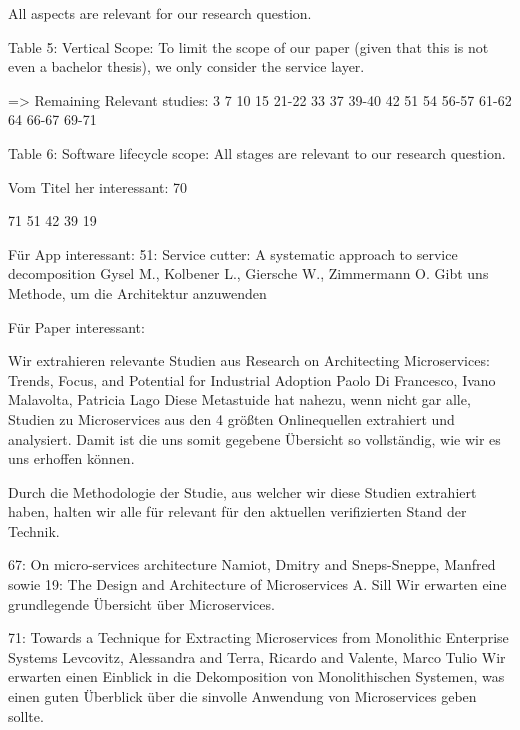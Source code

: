 \documentclass{article}
\begin{document}
    All aspects are relevant for our research question.


Table 5: Vertical Scope:
    To limit the scope of our paper (given that this is not even a bachelor thesis), we only consider the service layer.
 
=> Remaining Relevant studies:
    3
    7
    10
    15
    21-22
    33
    37
    39-40
    42
    51
    54
    56-57
    61-62
    64
    66-67
    69-71
    
Table 6: Software lifecycle scope:
    All stages are relevant to our research question.
    
    
    
Vom Titel her interessant:
    70
    
    71
    51
    42
    39
    19
    
Für App interessant:
51: Service cutter: A systematic approach to service decomposition
  Gysel M., Kolbener L., Giersche W., Zimmermann O.
Gibt uns Methode, um die Architektur anzuwenden
  
Für Paper interessant:
    
Wir extrahieren relevante Studien aus
Research on Architecting Microservices: Trends, Focus, and Potential for Industrial Adoption 
  Paolo Di Francesco, Ivano Malavolta, Patricia Lago                                                                                                                                                                                                                              
Diese Metastuide hat nahezu, wenn nicht gar alle, Studien zu Microservices aus den 4 größten Onlinequellen extrahiert und analysiert. Damit ist die uns somit gegebene Übersicht so vollständig, wie wir es uns erhoffen können.

Durch die Methodologie der Studie, aus welcher wir diese Studien extrahiert haben, halten wir alle für relevant für den aktuellen verifizierten Stand der Technik.
    
67: On micro-services architecture
  Namiot, Dmitry and Sneps-Sneppe, Manfred
  sowie
19: The Design and Architecture of Microservices
  A. Sill
Wir erwarten eine grundlegende Übersicht über Microservices.

71: Towards a Technique for Extracting Microservices from Monolithic Enterprise Systems
    Levcovitz, Alessandra and Terra, Ricardo and Valente, Marco Tulio
Wir erwarten einen Einblick in die Dekomposition von Monolithischen Systemen, was einen guten Überblick über die sinvolle Anwendung von Microservices geben sollte.
\end{document}
